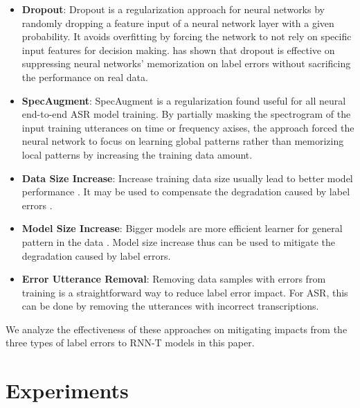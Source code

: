 \documentclass{article}
\begin{document}
\begin{itemize}
	\item \textbf{Dropout}\cite{dropout12}: Dropout is a regularization approach for neural networks by randomly dropping a feature input of a neural network layer with a given probability. It avoids overfitting by forcing the network to not rely on specific input features for decision making. \cite{Arplt2017} has shown that dropout is effective on suppressing neural networks' memorization on label errors without sacrificing the performance on real data.
	\item \textbf{SpecAugment}\cite{spec_aug2019}: SpecAugment is a regularization found useful for all neural end-to-end ASR model training. By partially masking the  spectrogram of the input training utterances on time or frequency axises, the approach forced the neural network to focus on learning global patterns rather than memorizing local patterns by increasing the training data amount.
	\item \textbf{Data Size Increase}: Increase training data size usually lead to better model performance \cite{Kaplan2020}. It may be used to compensate the degradation caused by label errors \cite{Rolnick2017}.
	\item \textbf{Model Size Increase}: Bigger models are more efficient learner for general pattern in the data \cite{Kaplan2020, Arplt2017}. Model size increase thus can be used to mitigate the degradation caused by label errors.
	\item \textbf{Error Utterance Removal}: Removing data samples with errors from training is a straightforward way to reduce label error impact. For ASR, this can be done by removing the utterances with incorrect transcriptions.
\end{itemize}

We analyze the effectiveness of these approaches on mitigating impacts from the three types of label errors to RNN-T models in this paper.


\section{Experiments}
\end{document}
